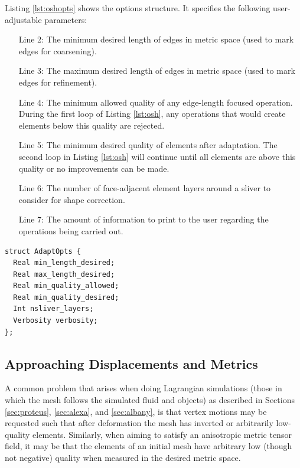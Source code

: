 Listing \ref{lst:oshopts} shows the options structure.
It specifies the following user-adjustable parameters:
\begin{enumerate}
\item[Line 2:] The minimum desired length of edges in metric space
(used to mark edges for coarsening).
\item[Line 3:] The maximum desired length of edges
in metric space (used to mark edges for refinement).
\item[Line 4:] The minimum allowed quality of any edge-length focused
operation. During the first loop of Listing \ref{lst:osh},
any operations that would create elements below this quality are rejected.
\item[Line 5:] The minimum desired quality of elements after adaptation.
The second loop in Listing \ref{lst:osh} will continue until
all elements are above this quality or no improvements can be made.
\item[Line 6:] The number of face-adjacent element layers around
a sliver to consider for shape correction.
\item[Line 7:] The amount of information to print to the user regarding
the operations being carried out.
\end{enumerate}

\begin{lstlisting}[float,style=dan-style,caption=Omega\_h parameters,label=lst:oshopts]
struct AdaptOpts {
  Real min_length_desired;
  Real max_length_desired;
  Real min_quality_allowed;
  Real min_quality_desired;
  Int nsliver_layers;
  Verbosity verbosity;
};
\end{lstlisting}

\subsection{Approaching Displacements and Metrics}
\label{sec:approach}

A common problem that arises when doing Lagrangian simulations
(those in which the mesh follows the simulated fluid and objects)
as described in Sections \ref{sec:proteus}, \ref{sec:alexa}, and \ref{sec:albany},
is that vertex motions may be requested such that after
deformation the mesh has inverted or arbitrarily low-quality elements.
Similarly, when aiming to satisfy an anisotropic metric tensor
field, it may be that the elements of an initial mesh have arbitrary low
(though not negative) quality when measured in the desired metric space.

